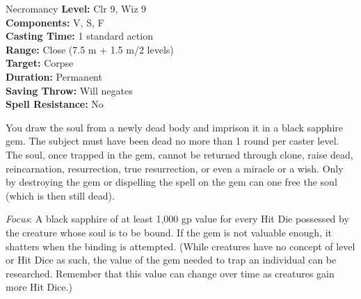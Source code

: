 {Necromancy}
{
	\textbf{Level:}
	Clr 9, Wiz 9\\
	\textbf{Components:}
	V, S, F\\
	\textbf{Casting Time:}
	1 standard action\\
	\textbf{Range:}
	Close (7.5 m + 1.5 m/2 levels)\\
	\textbf{Target:}
	Corpse\\
	\textbf{Duration:}
	Permanent\\
	\textbf{Saving Throw:}
	Will negates\\
	\textbf{Spell Resistance:}
	No\\
}
{
	You draw the soul from a newly dead body and imprison it in a black sapphire gem. The subject must have been dead no more than 1 round per caster level. The soul, once trapped in the gem, cannot be returned through clone, raise dead, reincarnation, resurrection, true resurrection, or even a miracle or a wish. Only by destroying the gem or dispelling the spell on the gem can one free the soul (which is then still dead).

	\textit{Focus}:
	A black sapphire of at least 1,000 gp value for every Hit Die possessed by the creature whose soul is to be bound. If the gem is not valuable enough, it shatters when the binding is attempted. (While creatures have no concept of level or Hit Dice as such, the value of the gem needed to trap an individual can be researched. Remember that this value can change over time as creatures gain more Hit Dice.)

}

